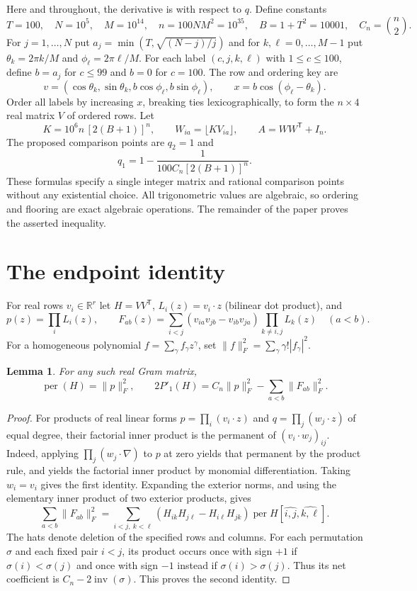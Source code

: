 \documentclass[11pt]{article}
\newtheorem{lemma}{Lemma}
\newcommand{\per}{\operatorname{per}}
\newcommand{\inv}{\operatorname{inv}}
\newcommand{\R}{\mathbb R}
\begin{document}
Here and throughout, the derivative is with respect to $q$. Define constants
\[
 T=100,\quad N=10^5,\quad M=10^{14},\quad n=100NM^2=10^{35},\quad B=1+T^2=10001,\quad C_n=\binom n2.
\]
For $j=1,\ldots,N$ put $a_j=\min(T,\sqrt{(N-j)/j})$ and for $k,\ell=0,\ldots,M-1$ put $\theta_k=2\pi k/M$ and $\phi_\ell=2\pi\ell/M$. For each label $(c,j,k,\ell)$ with $1\le c\le100$, define $b=a_j$ for $c\le99$ and $b=0$ for $c=100$. The row and ordering key are
\[
 v=(\cos\theta_k,\sin\theta_k,b\cos\phi_\ell,b\sin\phi_\ell),\qquad x=b\cos(\phi_\ell-\theta_k).
\]
Order all labels by increasing $x$, breaking ties lexicographically, to form the $n\times4$ real matrix $V$ of ordered rows. Let
\[
 K=10^6 n\,[2(B+1)]^n,\qquad W_{ia}=\lfloor K V_{ia}\rfloor,\qquad A=WW^{\mathsf T}+I_n.
\]
The proposed comparison points are $q_2=1$ and
\[
 q_1=1-\frac1{100 C_n[2(B+1)]^n}.
\]
These formulas specify a single integer matrix and rational comparison points without any existential choice. All trigonometric values are algebraic, so ordering and flooring are exact algebraic operations. The remainder of the paper proves the asserted inequality.

\section{The endpoint identity}
For real rows $v_i\in\R^r$ let $H=VV^{\mathsf T}$, $L_i(z)=v_i\cdot z$ (bilinear dot product), and
\[
 p(z)=\prod_i L_i(z),\qquad
 F_{ab}(z)=\sum_{i<j}(v_{ia}v_{jb}-v_{ib}v_{ja})\prod_{k\ne i,j}L_k(z)\quad (a<b).
\]
For a homogeneous polynomial $f=\sum_\gamma f_\gamma z^\gamma$, set $\|f\|_F^2=\sum_\gamma \gamma!|f_\gamma|^2$.

\begin{lemma}\label{endpoint}
For any such real Gram matrix,
\[
 \per(H)=\|p\|_F^2,\qquad 2P'_1(H)=C_n\|p\|_F^2-\sum_{a<b}\|F_{ab}\|_F^2.
\]
\end{lemma}
\begin{proof}
For products of real linear forms $p=\prod_i(v_i\cdot z)$ and $q=\prod_j(w_j\cdot z)$ of equal degree, their factorial inner product is the permanent of $(v_i\cdot w_j)_{ij}$. Indeed, applying $\prod_j(w_j\cdot\nabla)$ to $p$ at zero yields that permanent by the product rule, and yields the factorial inner product by monomial differentiation. Taking $w_i=v_i$ gives the first identity. Expanding the exterior norms, and using the elementary inner product of two exterior products, gives
\[
 \sum_{a<b}\|F_{ab}\|_F^2=
 \sum_{i<j,\ k<\ell}(H_{ik}H_{j\ell}-H_{i\ell}H_{jk})\per H[\widehat{i,j},\widehat{k,\ell}].
\]
The hats denote deletion of the specified rows and columns. For each permutation $\sigma$ and each fixed pair $i<j$, its product occurs once with sign $+1$ if $\sigma(i)<\sigma(j)$ and once with sign $-1$ instead if $\sigma(i)>\sigma(j)$. Thus its net coefficient is $C_n-2\inv(\sigma)$. This proves the second identity.
\end{proof}
\end{document}
